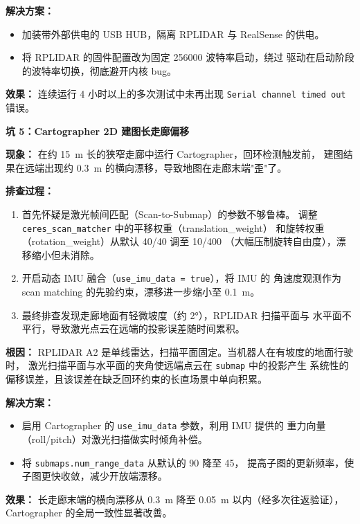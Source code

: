 \documentclass[11pt,a4paper]{article}
\begin{document}
\textbf{解决方案：}
\begin{itemize}
  \item 加装带外部供电的 USB HUB，隔离 RPLIDAR 与 RealSense 的供电。
  \item 将 RPLIDAR 的固件配置改为固定 256000 波特率启动，绕过
        驱动在启动阶段的波特率切换，彻底避开内核 bug。
\end{itemize}

\textbf{效果：}
连续运行 4 小时以上的多次测试中未再出现 \texttt{Serial channel timed out} 错误。

\vspace{2em}

\textbf{坑 5：Cartographer 2D 建图长走廊偏移}

\textbf{现象：}
在约 15~m 长的狭窄走廊中运行 Cartographer，回环检测触发前，
建图结果在远端出现约 0.3~m 的横向漂移，导致地图在走廊末端"歪"了。

\textbf{排查过程：}
\begin{enumerate}
  \item 首先怀疑是激光帧间匹配（Scan-to-Submap）的参数不够鲁棒。
        调整 \texttt{ceres\_scan\_matcher} 中的平移权重（translation\_weight）
        和旋转权重（rotation\_weight）从默认 40/40 调至 10/400
        （大幅压制旋转自由度），漂移缩小但未消除。
  \item 开启动态 IMU 融合（\texttt{use\_imu\_data = true}），将 IMU 的
        角速度观测作为 scan matching 的先验约束，漂移进一步缩小至 0.1~m。
  \item 最终排查发现走廊地面有轻微坡度（约 2°），RPLIDAR 扫描平面与
        水平面不平行，导致激光点云在远端的投影误差随时间累积。
\end{enumerate}

\textbf{根因：}
RPLIDAR A2 是单线雷达，扫描平面固定。当机器人在有坡度的地面行驶时，
激光扫描平面与水平面的夹角使远端点云在 \texttt{submap} 中的投影产生
系统性的偏移误差，且该误差在缺乏回环约束的长直场景中单向积累。

\textbf{解决方案：}
\begin{itemize}
  \item 启用 Cartographer 的 \texttt{use\_imu\_data} 参数，利用 IMU 提供的
        重力向量（roll/pitch）对激光扫描做实时倾角补偿。
  \item 将 \texttt{submaps.num\_range\_data} 从默认的 90 降至 45，
        提高子图的更新频率，使子图更快收敛，减少开放端漂移。
\end{itemize}

\textbf{效果：}
长走廊末端的横向漂移从 0.3~m 降至 0.05~m 以内（经多次往返验证），
Cartographer 的全局一致性显著改善。
\end{document}
